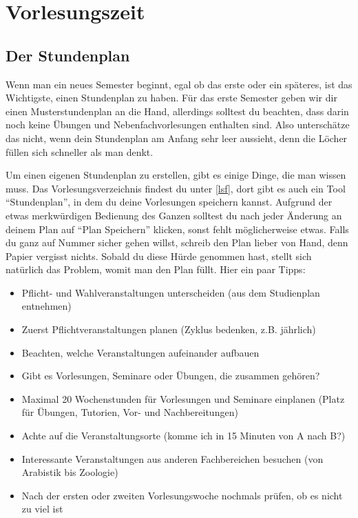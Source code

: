 ﻿\chapter{Vorlesungszeit}

\section{Der Stundenplan}

Wenn man ein neues Semester beginnt, egal ob das erste oder ein späteres, ist das Wichtigste, einen Stundenplan zu haben. Für das erste Semester geben wir dir einen Musterstundenplan an die Hand, allerdings solltest du beachten, dass darin noch keine Übungen und Nebenfachvorlesungen enthalten sind. Also unterschätze das nicht, wenn dein Stundenplan am Anfang sehr leer aussieht, denn die Löcher füllen sich schneller als man denkt.

Um einen eigenen Stundenplan zu erstellen, gibt es einige Dinge, die man wissen muss. Das Vorlesungsverzeichnis findest du unter \ref{lsf}, dort gibt es auch ein Tool ``Stundenplan'', in dem du deine Vorlesungen speichern kannst. Aufgrund der etwas merkwürdigen Bedienung des Ganzen solltest du nach jeder Änderung an deinem Plan auf ``Plan Speichern'' klicken, sonst fehlt möglicherweise etwas. Falls du ganz auf Nummer sicher gehen willst, schreib den Plan lieber von Hand, denn Papier vergisst nichts. Sobald du diese Hürde genommen hast, stellt sich natürlich das Problem, womit man den Plan füllt. Hier ein paar Tipps:

\begin{itemize}
	\item Pflicht- und Wahlveranstaltungen unterscheiden (aus dem Studienplan entnehmen)
	\item Zuerst Pflichtveranstaltungen planen (Zyklus bedenken, z.B. jährlich)
	\item Beachten, welche Veranstaltungen aufeinander aufbauen
	\item Gibt es Vorlesungen, Seminare oder Übungen, die zusammen gehören?
	\item Maximal 20 Wochenstunden für Vorlesungen und Seminare einplanen (Platz für Übungen, Tutorien, Vor- und Nachbereitungen)
	\item Achte auf die Veranstaltungsorte (komme ich in 15 Minuten von A nach B?)
	\item Interessante Veranstaltungen aus anderen Fachbereichen besuchen (von Arabistik bis Zoologie)
	\item Nach der ersten oder zweiten Vorlesungswoche nochmals prüfen, ob es nicht zu viel ist
\end{itemize}

